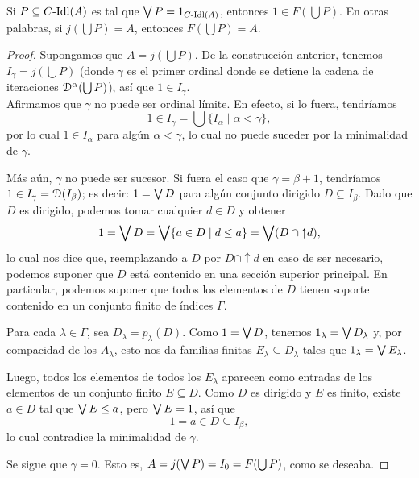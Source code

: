 \begin{lemma}
  Si $P\subseteq C\text{-}\mathrm{Idl}(A)$ es tal que $\bigvee P=1_{C\text{-}\mathrm{Idl}(A)}$,
  entonces $1\in F(\bigcup P)$.
  En otras palabras, si
  $j(\bigcup P)=A$, entonces $F(\bigcup P)=A$.
\end{lemma}
\begin{proof}
  Supongamos que $A=j(\bigcup P)$.
  De la construcción anterior, tenemos
  $I_\gamma=j(\bigcup P)$ (donde $\gamma$ es el primer
  ordinal donde se detiene la cadena de iteraciones
  $\mathcal D^\alpha(\bigcup P)$),
  así que $1\in I_\gamma$. \\
  Afirmamos que $\gamma$ no puede ser ordinal límite.
  En efecto, si lo fuera, tendríamos
  \[
      1 \in I_\gamma = \bigcup\{I_\alpha \mid \alpha<\gamma\}
  ,\]
  por lo cual $1\in I_\alpha$ para algún $\alpha<\gamma$, lo
  cual no puede suceder por la minimalidad de $\gamma$.

  Más aún, $\gamma$ no puede ser sucesor.
  Si fuera el caso que $\gamma=\beta+1$, tendríamos
  $1\in I_\gamma = \mathcal D(I_\beta)$;
  es decir: $1=\bigvee D$ para algún conjunto dirigido
  $D\subseteq I_\beta$.
  Dado que $D$ es dirigido, podemos tomar cualquier
  $d\in D$ y obtener
  \[
      1
      = \bigvee D
      = \bigvee\{a\in D\mid d\leq a\}
      = \bigvee(D\cap{\uparrow}d)
  ,\]
  lo cual nos dice que,
  reemplazando a $D$ por $D\cap{\uparrow}d$ en
  caso de ser necesario,
  podemos suponer que $D$ está contenido en una
  sección superior principal.
  En particular, podemos suponer que todos los elementos
  de $D$ tienen soporte contenido en
  un conjunto finito de índices $\Gamma$.

  Para cada $\lambda\in\Gamma$, sea $D_\lambda=p_\lambda(D)$.
  Como $1=\bigvee D$, tenemos $1_\lambda=\bigvee D_\lambda$ y,
  por compacidad de los $A_\lambda$, esto nos da familias finitas
  $E_\lambda\subseteq D_\lambda$ tales que
  $1_\lambda=\bigvee E_\lambda$.
  
  Luego, todos los elementos de todos los $E_\lambda$ aparecen
  como entradas de los elementos de un conjunto finito
  $E\subseteq D$.
  Como $D$ es dirigido y $E$ es finito,
  existe $a\in D$ tal que $\bigvee E\leq a$,
  pero $\bigvee E=1$, así que
  \[
      1 = a \in D\subseteq I_\beta
  ,\]
  lo cual contradice la minimalidad de $\gamma$.
  
  Se sigue que $\gamma=0$.
  Esto es, $A=j(\bigvee P) = I_0 = F(\bigcup P)$, como se deseaba.
\end{proof}


